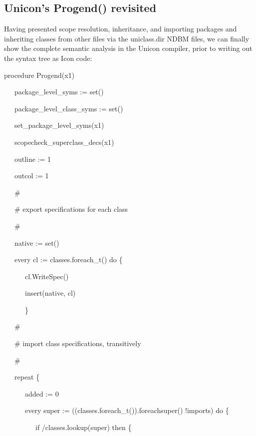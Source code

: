 \subsection{Unicon's Progend() revisited}

Having presented scope resolution, inheritance, and importing packages
and inheriting classes from other files via the uniclass.dir NDBM
files, we can finally show the complete semantic analysis in the
Unicon compiler, prior to writing out the syntax tree as Icon code:

{\ttfamily\mdseries
procedure Progend(x1)}


\bigskip

{\ttfamily\mdseries
\ \ \ package\_level\_syms := set()}

{\ttfamily\mdseries
\ \ \ package\_level\_class\_syms := set()}

{\ttfamily\mdseries
\ \ \ set\_package\_level\_syms(x1)}

{\ttfamily\mdseries
\ \ \ scopecheck\_superclass\_decs(x1)}


\bigskip

{\ttfamily\mdseries
\ \ \ outline := 1}

{\ttfamily\mdseries
\ \ \ outcol := 1}

{\ttfamily\mdseries
\ \ \ \#}

{\ttfamily\mdseries
\ \ \ \# export specifications for each class}

{\ttfamily\mdseries
\ \ \ \#}

{\ttfamily\mdseries
\ \ \ native := set()}

{\ttfamily\mdseries
\ \ \ every cl := classes.foreach\_t() do \{}

{\ttfamily\mdseries
\ \ \ \ \ \ cl.WriteSpec()}

{\ttfamily\mdseries
\ \ \ \ \ \ insert(native, cl)}

{\ttfamily\mdseries
\ \ \ \ \ \ \}}

{\ttfamily\mdseries
\ \ \ \#}

{\ttfamily\mdseries
\ \ \ \# import class specifications, transitively}

{\ttfamily\mdseries
\ \ \ \#}

{\ttfamily\mdseries
\ \ \ repeat \{}

{\ttfamily\mdseries
\ \ \ \ \ \ added := 0}

{\ttfamily\mdseries
\ \ \ \ \ \ every super := ((classes.foreach\_t()).foreachsuper() {\textbar} !imports) do \{}

{\ttfamily\mdseries
\ \ \ \ \ \ \ \ \ if /classes.lookup(super) then \{}

